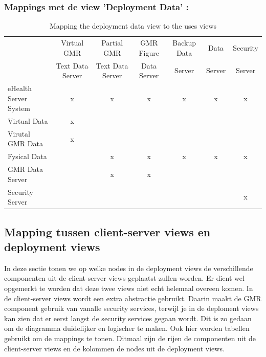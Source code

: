 \documentclass[a4paper,10pt]{article}
\begin{document}
\subsubsection*{Mappings met de view 'Deployment Data' : }
\begin{table}[h!]
\begin{center}
 \begin{tabular}{l| c | c | c | c | c | c |} 
 & Virtual GMR & Partial GMR & GMR Figure & Backup Data & Data& Security \\
 & Text Data Server & Text Data Server & Data Server & Server & Server & Server \\ \hline
eHealth Server System & x & x & x & x & x & x \\ \hline
\hspace{6pt}Virtual Data & x & & & & & \\ \hline
\hspace{12pt}Virutal GMR Data & x & & & & & \\ \hline
\hspace{6pt}Fysical Data & & x & x & x & x & x \\ \hline
\hspace{12pt}GMR Data Server & & x & x & & & \\ \hline
\hspace{12pt}Security Server & & & & & & x \\ \hline
\end{tabular}
\caption{Mapping the deployment data view to the uses views}
\end{center}
\end{table}

\subsection{Mapping tussen client-server views en deployment views}
In deze sectie tonen we op welke nodes in de deployment views de verschillende componenten uit de client-server views geplaatst zullen worden. Er dient wel opgemerkt te worden dat deze twee views niet echt helemaal overeen komen. In de client-server views wordt een extra abstractie gebruikt. Daarin maakt de GMR component gebruik van vanalle security services, terwijl je in de deploment views kan zien dat er eerst langst de security services gegaan wordt. Dit is zo gedaan om de diagramma duidelijker en logischer te maken. Ook hier worden tabellen gebruikt om de mappings te tonen. Ditmaal zijn de rijen de componenten uit de client-server views en de kolommen de nodes uit de deployment views.
\clearpage
\end{document}
